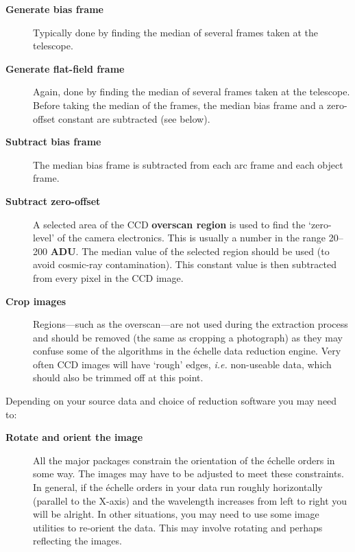 \documentclass[twoside,11pt]{article}
\newcommand{\htmlref}[2]{#1}
\newcommand{\sgspec}[2]{#1}
\newcommand{\sgspec}[2]{#2}
\begin{document}
\begin{description}

\item [{\bf Generate \htmlref{bias frame}{gl_bias_frame}}]
      Typically done by finding the median of several frames taken at
      the telescope.

\item [{\bf Generate \htmlref{flat-field frame}{gl_flat_field}}]
      Again, done by finding the median of several frames taken at
      the telescope.  Before taking the median of the frames, the
      median bias frame and a zero-offset constant are subtracted
      (see below).

\item [{\bf Subtract bias frame}]
      The median bias frame is subtracted from each arc frame and
      each object frame.

\item [{\bf Subtract zero-offset}]
      A selected area of the CCD \htmlref{{\bf overscan region}}{gl_overscan}
      is used to find the
      `zero-level' of the camera electronics.  This is usually a number
      in the range 20\sgspec{--}{-}200 \htmlref{{\bf ADU}}{gl_adu}\@.
      The median value of the selected region
      should be used (to avoid cosmic-ray contamination).  This constant
      value is then subtracted from every pixel in the CCD image.

\item [{\bf Crop images}]
      Regions\sgspec{---}{ - }such as the overscan\sgspec{---}{ - }are
      not used during the extraction
      process and should be removed (the same as cropping a photograph)
      as they may confuse some of the algorithms in the \'{e}chelle data
      reduction engine.  Very often CCD images will have `rough' edges,
      {\em i.e.} non-useable data, which should also be trimmed off at
      this point.

\end{description}

Depending on your source data and choice of reduction software you may
need to:

\begin{description}

\item [{\bf Rotate and orient the image}]
      All the major packages constrain the orientation of the \'{e}chelle
      orders in some way.  The images may have to be adjusted to meet
      these constraints.
      In general, if the \'{e}chelle orders in your data run roughly
      horizontally (parallel to the X-axis) and the wavelength increases
      from left to right you will be alright.
      In other situations, you may need to use some image utilities to
      re-orient the data.
      This may involve rotating and perhaps reflecting the images.

\end{description}
\end{document}
